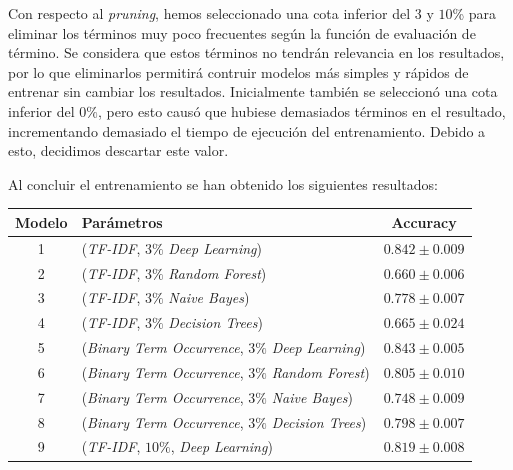 \documentclass[es]{uc3mreport}
\begin{document}
\begin{report}
    Con respecto al \textit{pruning}, hemos seleccionado una cota inferior del $3$ y $10$\%
    para eliminar los términos muy poco frecuentes según la función de evaluación
    de término. Se considera que estos términos no tendrán relevancia en los
    resultados, por lo que eliminarlos permitirá contruir modelos más simples y
    rápidos de entrenar sin cambiar los resultados. Inicialmente también se
    seleccionó una cota inferior del $0\%$, pero esto causó que hubiese demasiados
    términos en el resultado, incrementando demasiado el tiempo de ejecución del
    entrenamiento. Debido a esto, decidimos descartar este valor.

    Al concluir el entrenamiento se han obtenido los siguientes resultados:

    \begin{table}[H]
        \begin{center}
            \begin{tabular}{ @{}clc@{} }
                \toprule
                Modelo & Parámetros\footnotemark[1] & Accuracy\\
                \midrule
                1  & (\textit{TF-IDF}, $3\%$                 \textit{Deep Learning})  & $0.842 \pm 0.009$ \\
                2  & (\textit{TF-IDF}, $3\%$                 \textit{Random Forest})  & $0.660 \pm 0.006$ \\
                3  & (\textit{TF-IDF}, $3\%$                 \textit{Naive Bayes})    & $0.778 \pm 0.007$ \\
                4  & (\textit{TF-IDF}, $3\%$                 \textit{Decision Trees}) & $0.665 \pm 0.024$ \\
                5  & (\textit{Binary Term Occurrence}, $3\%$ \textit{Deep Learning})  & $0.843 \pm 0.005$ \\
                6  & (\textit{Binary Term Occurrence}, $3\%$ \textit{Random Forest})  & $0.805 \pm 0.010$ \\
                7  & (\textit{Binary Term Occurrence}, $3\%$ \textit{Naive Bayes})    & $0.748 \pm 0.009$ \\
                8  & (\textit{Binary Term Occurrence}, $3\%$ \textit{Decision Trees}) & $0.798 \pm 0.007$ \\
                9  & (\textit{TF-IDF}, $10\%$,               \textit{Deep Learning})  & $0.819 \pm 0.008$ \\

\end{tabular}
\end{center}
\end{table}
\end{report}
\end{document}

